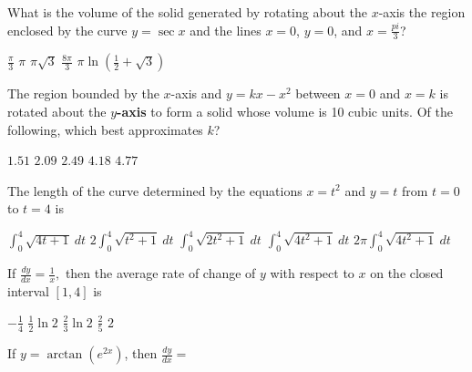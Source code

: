 \begin{questions}
\question[2] What is the volume of the solid generated by rotating
    about the $x$-axis the region enclosed by the curve $y = \sec x$
    and the lines $x = 0$, $y = 0$, and $x = \frac{pi}{3}$?

    \begin{oneparchoices}
    \choice $\frac{\pi}{3}$
    \choice $\pi$
    \CorrectChoice $\pi\sqrt{3}$
    \choice $\frac{8\pi}{3}$
    \choice $\pi\ln(\frac{1}{2} + \sqrt{3})$
    \end{oneparchoices}

\question[2] The region bounded by the $x$-axis and $y = kx - x^2$
    between $x = 0$ and $x = k$ is rotated about the {\bf $y$-axis} to
    form a solid whose volume is 10 cubic units. Of the following,
    which best approximates $k$?

    \begin{oneparchoices}
    \choice $1.51$
    \CorrectChoice $2.09$
    \choice $2.49$
    \choice $4.18$
    \choice $4.77$
    \end{oneparchoices}

\question[2] The length of the curve determined by the equations $x =
    t^2$ and $y = t$ from $t = 0$ to $t = 4$ is

    \begin{oneparchoices}
    \choice $\int_0^4 \sqrt{4t + 1}\ dt$
    \choice $2\int_0^4\sqrt{t^2 + 1}\ dt$
    \choice $\int_0^4\sqrt{2t^2 + 1}\ dt$
    \CorrectChoice $\int_0^4\sqrt{4t^2 + 1}\ dt$
    \choice $2\pi\int_0^4\sqrt{4t^2 + 1}\ dt$
    \end{oneparchoices}

\question[2] If $\frac{dy}{dx} = \frac{1}{x},$ then the average rate
    of change of $y$ with respect to $x$ on the closed interval $[1,
    4]$ is

    \begin{oneparchoices}
    \choice $-\frac{1}{4}$
    \choice $\frac{1}{2}\ln 2$
    \CorrectChoice $\frac{2}{3}\ln 2$
    \choice $\frac{2}{5}$
    \choice $2$
    \end{oneparchoices}

\question[2] If $y = \arctan(e^{2x})$, then $\frac{dy}{dx} =$


\end{questions}
